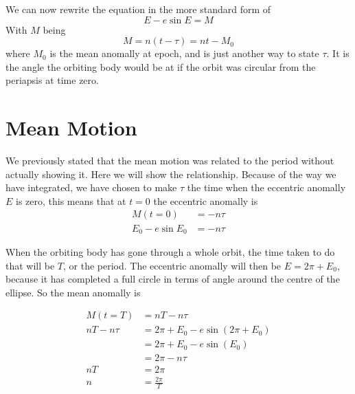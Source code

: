 We can now rewrite the equation in the more standard form of 
\begin{equation}
E - e \sin E=M
\end{equation}
With $M$ being
\begin{equation}
M = n(t-\tau) = nt - M_0
\end{equation}
where $M_0$ is the mean anomally at epoch, and is just another way to state $\tau$.
It is the angle the orbiting body would be at if the orbit was circular from the periapsis
at time zero.

\section{Mean Motion}

We previously stated that the mean motion was related to the period without actually showing it.
Here we will show the relationship. Because of the way we have integrated, we have chosen to make
$\tau$ the time when the eccentric anomally $E$ is zero, this means that at $t=0$ the eccentric
anomally is
\begin{align}
M(t=0)&= -n\tau \nonumber \\
E_0 - e \sin E_0 & = -n\tau
\end{align}

When the orbiting body has gone through a whole orbit, the time 
taken to do that will be $T$, or the period. The eccentric anomally will then be $E=2\pi+E_0$, because
it has completed a full circle in terms of angle around the centre of the ellipse. So the mean
anomally is

\begin{align}
M(t=T)&= nT - n\tau \nonumber \\
nT - n\tau&=2\pi +E_0 - e \sin (2\pi + E_0)\nonumber \\
&=2\pi +E_0 - e \sin (E_0)\nonumber \\
&= 2\pi -n\tau\nonumber \\
nT &= 2\pi \nonumber \\
n &= \frac{2\pi}{T}
\end{align}
